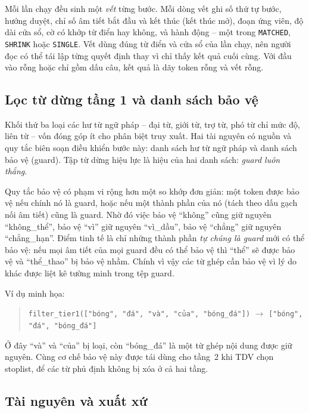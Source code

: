 Mỗi lần chạy đều sinh một \emph{vết} từng bước. Mỗi dòng vết ghi số thứ tự bước,
hướng duyệt, chỉ số âm tiết bắt đầu và kết thúc (kết thúc mở), đoạn ứng viên, độ
dài cửa sổ, cờ có khớp từ điển hay không, và hành động -- một trong
\texttt{MATCHED}, \texttt{SHRINK} hoặc \texttt{SINGLE}. Vết dùng đúng từ điển và
cửa sổ của lần chạy, nên người đọc có thể tái lập từng quyết định thay vì chỉ thấy
kết quả cuối cùng. Với đầu vào rỗng hoặc chỉ gồm dấu câu, kết quả là dãy token rỗng
và vết rỗng.

\subsection{Lọc từ dừng tầng 1 và danh sách bảo vệ}

Khối thứ ba loại các hư từ ngữ pháp -- đại từ, giới từ, trợ từ, phó từ chỉ mức độ,
liên từ -- vốn đóng góp ít cho phân biệt truy xuất. Hai tài nguyên có nguồn và quy
tắc biên soạn điều khiển bước này: danh sách hư từ ngữ pháp và danh sách bảo vệ
(guard). Tập từ dừng hiệu lực là hiệu của hai danh sách: \emph{guard luôn thắng}.

Quy tắc bảo vệ có phạm vi rộng hơn một so khớp đơn giản: một token được bảo vệ nếu
chính nó là guard, hoặc nếu một thành phần của nó (tách theo dấu gạch nối âm tiết)
cũng là guard. Nhờ đó việc bảo vệ ``không'' cũng giữ nguyên ``không\_thể'', bảo vệ
``vì'' giữ nguyên ``vì\_dầu'', bảo vệ ``chẳng'' giữ nguyên ``chẳng\_hạn''. Điểm
tinh tế là chỉ những thành phần \emph{tự chúng là guard} mới có thể bảo vệ: nếu mọi
âm tiết của mọi guard đều có thể bảo vệ thì ``thể'' sẽ được bảo vệ và ``thể\_thao''
bị bảo vệ nhầm. Chính vì vậy các từ ghép cần bảo vệ vì lý do khác được liệt kê
tường minh trong tệp guard.

Ví dụ minh họa:

\begin{quote}
\texttt{filter\_tier1(["bóng", "đá", "và", "của", "bóng\_đá"])}
$\rightarrow$ \texttt{["bóng", "đá", "bóng\_đá"]}
\end{quote}

Ở đây ``và'' và ``của'' bị loại, còn ``bóng\_đá'' là một từ ghép nội dung được giữ
nguyên. Cùng cơ chế bảo vệ này được tái dùng cho tầng~2 khi TDV chọn stoplist, để
các từ phủ định không bị xóa ở cả hai tầng.

\subsection{Tài nguyên và xuất xứ}

